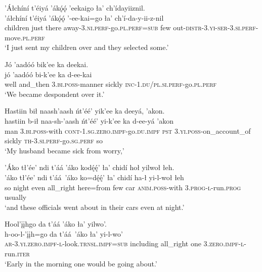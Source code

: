 \ea\label{ex:text8-1-5}
’Áłchíní t’éiyá ’ákǫ́ǫ́ ’eekaigo ła’ ch’ídayiiznil.\\
\gll ’áłchíní	t’éiyá	’ákǫ́ǫ́	’-ee-kai=go	ła’	ch’í-da-y-ii-z-nil\\
     children	just	there	away-3.\textsc{ni}.\textsc{perf}-go.\textsc{pl}.\textsc{perf}=\textsc{sub}	few	out-\textsc{distr}-3.\textsc{yi}-\textsc{ser}-3.\textsc{si}.\textsc{perf}-move.\textsc{pl}.\textsc{perf}\\
\glt `I just sent my children over and they selected some.'
\z

\ea\label{ex:text8-2-1}
Jó ’aadóó bik’ee ka deekai.\\
\gll jó	’aadóó	bi-k’ee	ka	d-ee-kai\\
     well	and\_then	3.\textsc{bi}.\textsc{poss}-manner	sickly	\textsc{inc}-1.\textsc{du}/\textsc{pl}.\textsc{si}.\textsc{perf}-go.\textsc{pl}.\textsc{perf}\\
\glt `We became despondent over it.'
\z

\ea\label{ex:text8-2-2}
Hastiin bił naash’aash ńt’éé’ yik’ee ka deeyá, ’akon.\\
\gll hastiin	b-ił	naa-sh-’aash	ńt’éé’	yi-k’ee	ka	d-ee-yá	’akon\\
     man	3.\textsc{bi}.\textsc{poss}-with	\textsc{cont}-1.\textsc{sg}.\textsc{zero}.\textsc{impf}-go.\textsc{du}.\textsc{impf}	\textsc{pst}	3.\textsc{yi}.\textsc{poss}-on\_account\_of	sickly	\textsc{th}-3.\textsc{si}.\textsc{perf}-go.\textsc{sg}.\textsc{perf}	so\\
\glt `My husband became sick from worry,'
\z

\ea\label{ex:text8-2-3}
’Áko tł’ée’ ndi t’áá ’áko kodę́ę́’ ła’ chidí hoł yilwoł łeh.\\
\gll ’áko	tł’ée’	ndi	t’áá~{’áko}	ko=dę́ę́’	ła’	chidí	ha-ł	yi-l-woł	łeh\\
     so	night	even	all\_right	here=from	few	car	\textsc{anim}.\textsc{poss}-with	3.\textsc{prog}-\textsc{l}-run.\textsc{prog}	usually\\
\glt `and these officials went about in their cars even at night.'
\z

\ea\label{ex:text8-2-4}
Hool’įįhgo da t’áá ’áko ła’ yilwo’.\\
\gll h-oo-l-’įįh=go	da	t’áá~{’áko}	ła’	yi-l-wo’\\
     \textsc{ar}-3.\textsc{yi}.\textsc{zero}.\textsc{impf}-\textsc{l}-look.\textsc{trnsl}.\textsc{impf}=\textsc{sub}	including	all\_right	one	3.\textsc{zero}.\textsc{impf}-\textsc{l}-run.\textsc{iter}\\
\glt `Early in the morning one would be going about.'
\z

